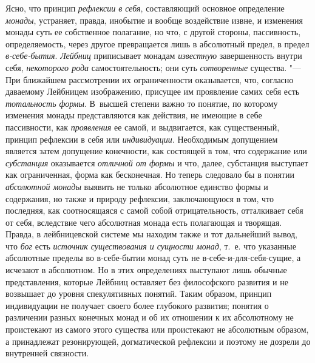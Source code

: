 Ясно, что принцип {\em рефлексии в себя}, составляющий
основное определение {\em монады}, устраняет, правда,
инобытие и вообще воздействие извне, и изменения монады суть ее собственное
полагание, но что, с другой стороны, пассивность, определяемость, через
другое превращается лишь в абсолютный предел, в предел
{\em в-себе-бытия}. {\em Лейбниц}
приписывает монадам {\em известную} завершенность
внутри себя, {\em некоторого рода} самостоятельность;
они суть {\em сотворенные} существа. "--- При ближайшем
рассмотрении их ограниченности оказывается, что, согласно даваемому
Лейбницем изображению, присущее им проявление самих себя есть
{\em тотальность формы}. В~высшей степени важно то
понятие, по которому изменения монады представляются как действия, не
имеющие в себе пассивности, как {\em проявления} ее
самой, и выдвигается, как существенный, принцип рефлексии в себя или
{\em индивидуации}. Необходимым допущением является
затем допущение конечности, как состоящей в том, что содержание или
{\em субстанция} оказывается {\em отличной от формы} и что, далее, субстанция
выступает как ограниченная, форма как бесконечная. Но теперь следовало бы в
понятии {\em абсолютной монады} выявить не только
абсолютное единство формы и содержания, но также и природу рефлексии,
заключающуюся в том, что последняя, как соотносящаяся с самой собой
отрицательность, отталкивает себя от себя, вследствие чего абсолютная
монада есть полагающая и творящая. Правда, в лейбницевской системе мы
находим также и тот дальнейший вывод, что {\em бог}
есть {\em источник существования и сущности монад},
т.~е. что указанные абсолютные пределы во в-себе-бытии монад суть не
в-себе-и-для-себя-сущие, а исчезают в абсолютном. Но в этих определениях
выступают лишь обычные представления, которые Лейбниц оставляет без
философского развития и не возвышает до уровня спекулятивных понятий. Таким
образом, принцип индивидуации не получает своего более глубокого развития;
понятия о различении разных конечных монад и об их отношении к их
абсолютному не проистекают из самого этого существа или проистекают не
абсолютным образом, а принадлежат резонирующей, догматической рефлексии и
поэтому не дозрели до внутренней связности.

